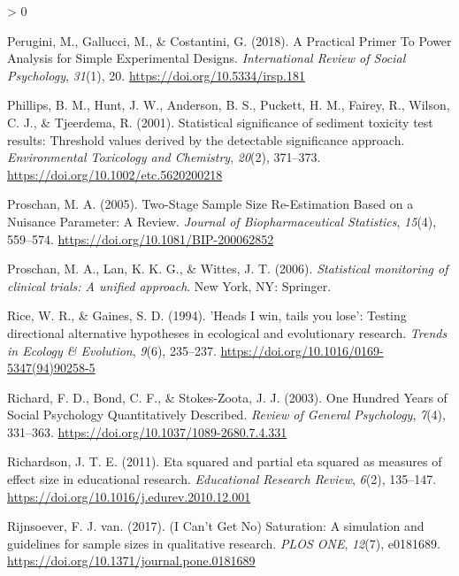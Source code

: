 \documentclass[
  english,
  ,jou,floatsintext]{apa6}
\newlength{\cslhangindent}
\newenvironment{CSLReferences}[2] %
 {%
  \setlength{\parindent}{0pt}
  \ifodd #1 \everypar{\setlength{\hangindent}{\cslhangindent}}\ignorespaces\fi
  \ifnum #2 > 0
  \setlength{\parskip}{#2\baselineskip}
  \fi
 }%
 {}
\begin{document}
\begin{CSLReferences}{1}{0}
\leavevmode\hypertarget{ref-perugini_practical_2018}{}%
Perugini, M., Gallucci, M., \& Costantini, G. (2018). A {Practical Primer To Power Analysis} for {Simple Experimental Designs}. \emph{International Review of Social Psychology}, \emph{31}(1), 20. \url{https://doi.org/10.5334/irsp.181}

\leavevmode\hypertarget{ref-phillips_statistical_2001}{}%
Phillips, B. M., Hunt, J. W., Anderson, B. S., Puckett, H. M., Fairey, R., Wilson, C. J., \& Tjeerdema, R. (2001). Statistical significance of sediment toxicity test results: {Threshold} values derived by the detectable significance approach. \emph{Environmental Toxicology and Chemistry}, \emph{20}(2), 371--373. \url{https://doi.org/10.1002/etc.5620200218}

\leavevmode\hypertarget{ref-proschan_two-stage_2005}{}%
Proschan, M. A. (2005). Two-{Stage Sample Size Re-Estimation Based} on a {Nuisance Parameter}: {A Review}. \emph{Journal of Biopharmaceutical Statistics}, \emph{15}(4), 559--574. \url{https://doi.org/10.1081/BIP-200062852}

\leavevmode\hypertarget{ref-proschan_statistical_2006}{}%
Proschan, M. A., Lan, K. K. G., \& Wittes, J. T. (2006). \emph{Statistical monitoring of clinical trials: A unified approach}. {New York, NY}: {Springer}.

\leavevmode\hypertarget{ref-rice_heads_1994}{}%
Rice, W. R., \& Gaines, S. D. (1994). '{Heads I} win, tails you lose': Testing directional alternative hypotheses in ecological and evolutionary research. \emph{Trends in Ecology \& Evolution}, \emph{9}(6), 235--237. \url{https://doi.org/10.1016/0169-5347(94)90258-5}

\leavevmode\hypertarget{ref-richard_one_2003}{}%
Richard, F. D., Bond, C. F., \& Stokes-Zoota, J. J. (2003). One {Hundred Years} of {Social Psychology Quantitatively Described}. \emph{Review of General Psychology}, \emph{7}(4), 331--363. \url{https://doi.org/10.1037/1089-2680.7.4.331}

\leavevmode\hypertarget{ref-richardson_eta_2011}{}%
Richardson, J. T. E. (2011). Eta squared and partial eta squared as measures of effect size in educational research. \emph{Educational Research Review}, \emph{6}(2), 135--147. \url{https://doi.org/10.1016/j.edurev.2010.12.001}

\leavevmode\hypertarget{ref-rijnsoever_i_2017}{}%
Rijnsoever, F. J. van. (2017). ({I Can}'t {Get No}) {Saturation}: {A} simulation and guidelines for sample sizes in qualitative research. \emph{PLOS ONE}, \emph{12}(7), e0181689. \url{https://doi.org/10.1371/journal.pone.0181689}


\end{CSLReferences}
\end{document}
